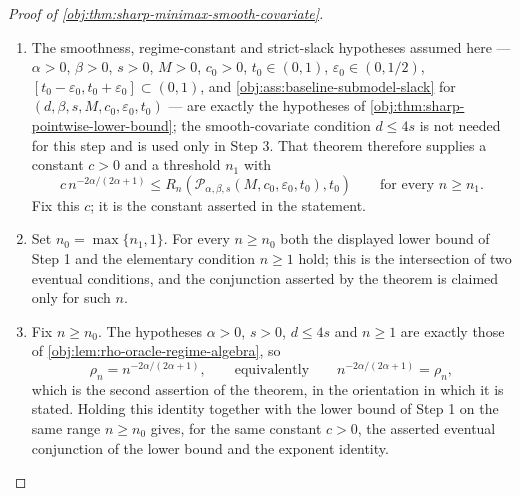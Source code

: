 \begin{proof}[Proof of \cref{obj:thm:sharp-minimax-smooth-covariate}]
\begin{enumerate}
\item The smoothness, regime-constant and strict-slack hypotheses assumed here — \(\alpha>0\),
\(\beta>0\), \(s>0\), \(M>0\), \(c_0>0\), \(t_0\in(0,1)\), \(\varepsilon_0\in(0,1/2)\),
\([t_0-\varepsilon_0,t_0+\varepsilon_0]\subset(0,1)\), and \cref{obj:ass:baseline-submodel-slack}
for \((d,\beta,s,M,c_0,\varepsilon_0,t_0)\) — are exactly the hypotheses of
\cref{obj:thm:sharp-pointwise-lower-bound}; the smooth-covariate condition \(d\le 4s\) is not needed
for this step and is used only in Step 3. That theorem therefore supplies a constant \(c>0\) and a
threshold \(n_1\) with
\[
c\,n^{-2\alpha/(2\alpha+1)}
\le
R_n\!\left(
\mathcal P_{\alpha,\beta,s}(M,c_0,\varepsilon_0,t_0),t_0
\right)
\qquad\text{for every }n\ge n_1 .
\]
Fix this \(c\); it is the constant asserted in the statement. %

\item Set \(n_0=\max\{n_1,1\}\). For every \(n\ge n_0\) both the displayed lower bound of Step 1 and
the elementary condition \(n\ge1\) hold; this is the intersection of two eventual conditions, and
the conjunction asserted by the theorem is claimed only for such \(n\).

\item Fix \(n\ge n_0\). The hypotheses \(\alpha>0\), \(s>0\), \(d\le 4s\) and \(n\ge1\) are exactly
those of \cref{obj:lem:rho-oracle-regime-algebra}, so
\[
\rho_n
=
n^{-2\alpha/(2\alpha+1)},
\qquad\text{equivalently}\qquad
n^{-2\alpha/(2\alpha+1)}=\rho_n ,
\]
which is the second assertion of the theorem, in the orientation in which it is stated. Holding this
identity together with the lower bound of Step 1 on the same range \(n\ge n_0\) gives, for the same
constant \(c>0\), the asserted eventual conjunction of the lower bound and the exponent identity.
\end{enumerate}
\end{proof}

